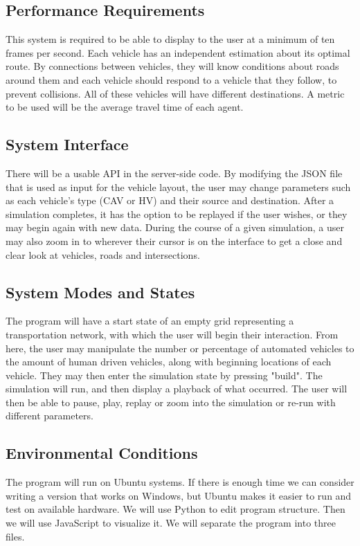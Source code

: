 \documentclass[onecolumn, draftclsnofoot,10pt, compsoc]{IEEEtran}
\begin{document}
\subsection{Performance Requirements}
This system is required to be able to display to the user at a minimum of ten frames per second.
Each vehicle has an independent estimation about its optimal route.
By connections between vehicles, they will know conditions about roads around them and each vehicle should respond to a vehicle that they follow, to prevent collisions.
All of these vehicles will have different destinations.
A metric to be used will be the average travel time of each agent.
\subsection{System Interface}
There will be a usable API in the server-side code.
By modifying the JSON file that is used as input for the vehicle layout, the user may change parameters such as each vehicle's type (CAV or HV) and their source and destination.
After a simulation completes, it has the option to be replayed if the user wishes, or they may begin again with new data.
During the course of a given simulation, a user may also zoom in to wherever their cursor is on the interface to get a close and clear look at vehicles, roads and intersections.
\subsection{System Modes and States}
The program will have a start state of an empty grid representing a transportation network, with which the user will begin their interaction.
From here, the user may manipulate the number or percentage of automated vehicles to the amount of human driven vehicles, along with beginning locations of each vehicle.
They may then enter the simulation state by pressing "build".
The simulation will run, and then display a playback of what occurred.
The user will then be able to pause, play, replay or zoom into the simulation or re-run with different parameters.
\subsection{Environmental Conditions}
The program will run on Ubuntu systems.
If there is enough time we can consider writing a version that works on Windows, but Ubuntu makes it easier to run and test on available hardware.
We will use Python to edit program structure.
Then we will use JavaScript to visualize it.
We will separate the program into three files.
\end{document}
